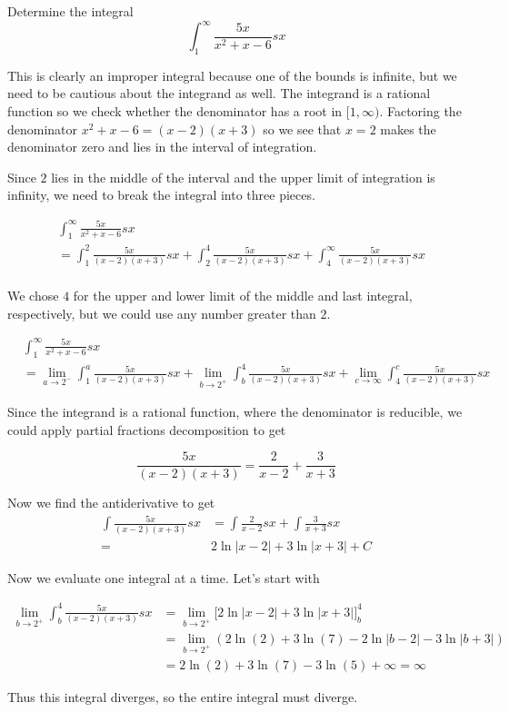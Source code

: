 \documentclass{ximera}
\begin{document}
\begin{example}
Determine the integral
\[
\int_{1}^{\infty} \frac{5x}{x^2+x-6} sx 
\]


\begin{explanation}
This is clearly an improper integral because one of the bounds is infinite, but we need to be cautious about the integrand as well. The integrand is a rational function so we check whether the denominator has a root in $[1,\infty)$.  Factoring the denominator $x^2+x-6=(x-2)(x+3)$ so we see that $x=2$ makes the denominator zero and lies in the interval of integration. 

Since $2$ lies in the middle of the interval and the upper limit of integration is infinity, we need to break the integral into three pieces.

\begin{align*}
& \int_{1}^{\infty} \frac{5x}{x^2+x-6} sx \\
&= \int_{1}^{2} \frac{5x}{(x-2)(x+3)} sx  + \int_{2}^{4} \frac{5x}{(x-2)(x+3)} sx + \int_{4}^{\infty} \frac{5x}{(x-2)(x+3)} sx\\
\end{align*}

We chose $4$ for the upper and lower limit of the middle and last integral, respectively, but we could use any number greater than $2$.

\begin{align*}
 & \int_{1}^{\infty} \frac{5x}{x^2+x-6} sx \\
        &=\lim_{a \to 2^{-}} \int_{1}^a \frac{5x}{(x-2)(x+3)} sx + \lim_{b \to 2^{+}} \int_{b}^{4} \frac{5x}{(x-2)(x+3)} sx +\lim_{c \to \infty} \int_{4}^{c} \frac{5x}{(x-2)(x+3)} sx
\end{align*}

Since the integrand is a rational function, where the denominator is reducible, we could apply partial fractions decomposition to get

\[
\frac{5x}{(x-2)(x+3)}=\frac{ 2}{x-2} +\frac{ 3}{x+3}
\]


Now we find the antiderivative to get 
\begin{align*}
\int \frac{5x}{(x-2)(x+3)} sx&=\int \frac{ 2}{x-2} sx + \int \frac{ 3}{x+3} sx \\
=& 2\ln|x-2| + 3\ln|x+3 | + C
\end{align*}


Now we evaluate one integral at a time.  Let's start with

\begin{align*}
\lim_{b \to 2^{+}} \int_{b}^{4} \frac{5x}{(x-2)(x+3)} sx&= \lim_{b \to 2^{+}} \bigg[ 2\ln|x-2| + 3\ln|x+3 | \bigg]_{b}^{4} \\
&=\lim_{b \to 2^{+}} (2\ln(2) + 3 \ln(7) - 2\ln|b-2| -3\ln|b+3| ) \\
&=2\ln(2) +3\ln(7)-3\ln(5) + \infty=\infty
\end{align*}

Thus this integral diverges, so the entire integral must diverge. 

\end{explanation}
\end{example}
\end{document}

